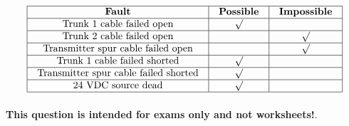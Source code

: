 






$$\vbox{\offinterlineskip
\halign{\strut
\vrule \quad\hfil # \ \hfil & 
\vrule \quad\hfil # \ \hfil & 
\vrule \quad\hfil # \ \hfil \vrule \cr
\noalign{\hrule}
%
{\bf Fault} & {\bf Possible} & {\bf Impossible} \cr
%
\noalign{\hrule}
%
Trunk 1 cable failed open & $\surd$ &  \cr
%
\noalign{\hrule}
%
Trunk 2 cable failed open &  & $\surd$ \cr
%
\noalign{\hrule}
%
Transmitter spur cable failed open &  & $\surd$ \cr
%
\noalign{\hrule}
%
%
%
Trunk 1 cable failed shorted & $\surd$ &  \cr
%
\noalign{\hrule}
%
%
%
%
%
%
%
Transmitter spur cable failed shorted & $\surd$ &  \cr
%
\noalign{\hrule}
%
%
%
24 VDC source dead & $\surd$ &  \cr
%
\noalign{\hrule}
} %
}$$ %







{\bf This question is intended for exams only and not worksheets!}.


